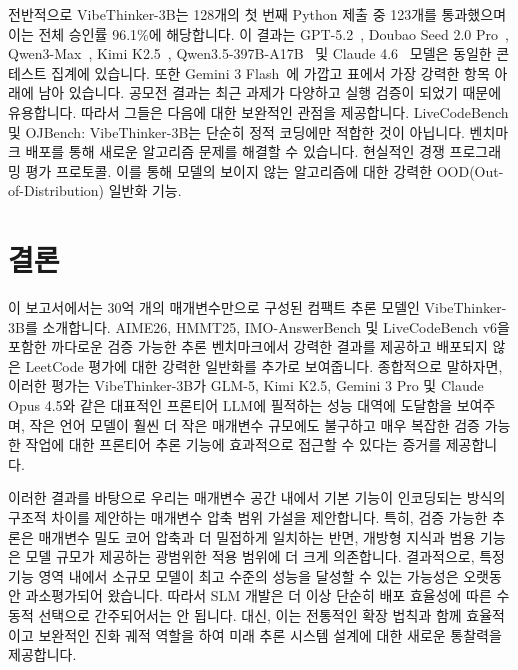 \documentclass{article}
\begin{document}
전반적으로 VibeThinker-3B는 128개의 첫 번째 Python 제출 중 123개를 통과했으며 이는 전체 승인률 96.1\%에 해당합니다. 이 결과는 GPT-5.2~\cite{openai2025gpt52systemcard}, Doubao Seed 2.0 Pro~\cite{bytedanceseed2026seed20release}, Qwen3-Max~\cite{qwen3max}, Kimi K2.5~\cite{team2026kimik2.5}, Qwen3.5-397B-A17B~\cite{qwen3.5} 및 Claude 4.6~\cite{anthropic2026claudeopus46systemcard} 모델은 동일한 콘테스트 집계에 있습니다. 또한 Gemini 3 Flash~\cite{googledeepmind2025gemini3flashmodelcard}에 가깝고 표에서 가장 강력한 항목 아래에 남아 있습니다. 공모전 결과는 최근 과제가 다양하고 실행 검증이 되었기 때문에 유용합니다. 따라서 그들은 다음에 대한 보완적인 관점을 제공합니다.
LiveCodeBench 및 OJBench: VibeThinker-3B는 단순히 정적 코딩에만 적합한 것이 아닙니다.
벤치마크 배포를 통해 새로운 알고리즘 문제를 해결할 수 있습니다.
현실적인 경쟁 프로그래밍 평가 프로토콜. 이를 통해 모델의
보이지 않는 알고리즘에 대한 강력한 OOD(Out-of-Distribution) 일반화 기능.

\section{결론}


이 보고서에서는 30억 개의 매개변수만으로 구성된 컴팩트 추론 모델인 VibeThinker-3B를 소개합니다. AIME26, HMMT25, IMO-AnswerBench 및 LiveCodeBench v6을 포함한 까다로운 검증 가능한 추론 벤치마크에서 강력한 결과를 제공하고 배포되지 않은 LeetCode 평가에 대한 강력한 일반화를 추가로 보여줍니다. 종합적으로 말하자면, 이러한 평가는 VibeThinker-3B가 GLM-5, Kimi K2.5, Gemini 3 Pro 및 Claude Opus 4.5와 같은 대표적인 프론티어 LLM에 필적하는 성능 대역에 도달함을 보여주며, 작은 언어 모델이 훨씬 더 작은 매개변수 규모에도 불구하고 매우 복잡한 검증 가능한 작업에 대한 프론티어 추론 기능에 효과적으로 접근할 수 있다는 증거를 제공합니다.

이러한 결과를 바탕으로 우리는 매개변수 공간 내에서 기본 기능이 인코딩되는 방식의 구조적 차이를 제안하는 매개변수 압축 범위 가설을 제안합니다. 특히, 검증 가능한 추론은 매개변수 밀도 코어 압축과 더 밀접하게 일치하는 반면, 개방형 지식과 범용 기능은 모델 규모가 제공하는 광범위한 적용 범위에 더 크게 의존합니다. 결과적으로, 특정 기능 영역 내에서 소규모 모델이 최고 수준의 성능을 달성할 수 있는 가능성은 오랫동안 과소평가되어 왔습니다. 따라서 SLM 개발은 더 이상 단순히 배포 효율성에 따른 수동적 선택으로 간주되어서는 안 됩니다. 대신, 이는 전통적인 확장 법칙과 함께 효율적이고 보완적인 진화 궤적 역할을 하여 미래 추론 시스템 설계에 대한 새로운 통찰력을 제공합니다.
\end{document}
